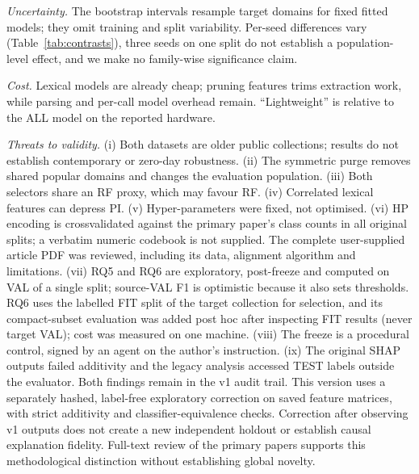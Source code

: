 \textit{Uncertainty.} The bootstrap intervals resample target domains for fixed fitted models; they omit training and split variability. Per-seed differences vary (Table~\ref{tab:contrasts}), three seeds on one split do not establish a population-level effect, and we make no family-wise significance claim.

\textit{Cost.} Lexical models are already cheap; pruning features trims extraction work, while parsing and per-call model overhead remain. ``Lightweight'' is relative to the ALL model on the reported hardware.

\textit{Threats to validity.} (i) Both datasets are older public collections; results do not establish contemporary or zero-day robustness. (ii) The symmetric purge removes shared popular domains and changes the evaluation population. (iii) Both selectors share an RF proxy, which may favour RF. (iv) Correlated lexical features can depress PI. (v) Hyper-parameters were fixed, not optimised. (vi) HP encoding is crossvalidated against the primary paper's class counts in all original splits; a verbatim numeric codebook is not supplied. The complete user-supplied article PDF was reviewed, including its data, alignment algorithm and limitations. (vii) RQ5 and RQ6 are exploratory, post-freeze and computed on VAL of a single split; source-VAL F1 is optimistic because it also sets thresholds. RQ6 uses the labelled FIT split of the target collection for selection, and its compact-subset evaluation was added post hoc after inspecting FIT results (never target VAL); cost was measured on one machine. (viii) The freeze is a procedural control, signed by an agent on the author's instruction. (ix) The original SHAP outputs failed additivity and the legacy analysis accessed TEST labels outside the evaluator. Both findings remain in the v1 audit trail. This version uses a separately hashed, label-free exploratory correction on saved feature matrices, with strict additivity and classifier-equivalence checks. Correction after observing v1 outputs does not create a new independent holdout or establish causal explanation fidelity. Full-text review of the primary papers supports this methodological distinction without establishing global novelty.
